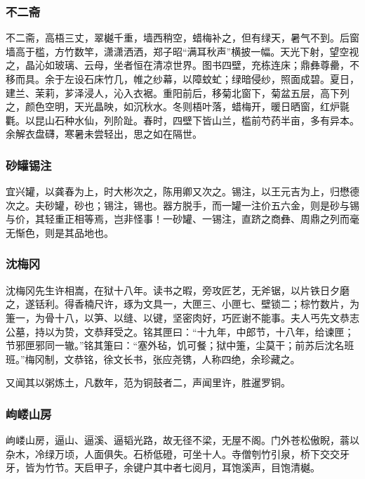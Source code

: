 \documentclass[]{article}
\begin{document}
\hypertarget{header-n158}{%
\subsubsection{不二斋}\label{header-n158}}

不二斋，高梧三丈，翠樾千重，墙西稍空，蜡梅补之，但有绿天，暑气不到。后窗墙高于槛，方竹数竿，潇潇洒洒，郑子昭``满耳秋声''横披一幅。天光下射，望空视之，晶沁如玻璃、云母，坐者恒在清凉世界。图书四壁，充栋连床；鼎彝尊罍，不移而具。余于左设石床竹几，帷之纱幕，以障蚊虻；绿暗侵纱，照面成碧。夏日，建兰、茉莉，芗泽浸人，沁入衣裾。重阳前后，移菊北窗下，菊盆五层，高下列之，颜色空明，天光晶映，如沉秋水。冬则梧叶落，蜡梅开，暖日晒窗，红炉毾氍。以昆山石种水仙，列阶趾。春时，四壁下皆山兰，槛前芍药半亩，多有异本。余解衣盘礴，寒暑未尝轻出，思之如在隔世。

\hypertarget{header-n163}{%
\subsubsection{砂罐锡注}\label{header-n163}}

宜兴罐，以龚春为上，时大彬次之，陈用卿又次之。锡注，以王元吉为上，归懋德次之。夫砂罐，砂也；锡注，锡也。器方脱手，而一罐一注价五六金，则是砂与锡与价，其轻重正相等焉，岂非怪事！一砂罐、一锡注，直跻之商彝、周鼎之列而毫无惭色，则是其品地也。

\hypertarget{header-n168}{%
\subsubsection{沈梅冈}\label{header-n168}}

沈梅冈先生许相嵩，在狱十八年。读书之暇，旁攻匠艺，无斧锯，以片铁日夕磨之，遂铦利。得香楠尺许，琢为文具一，大匣三、小匣七、壁锁二；棕竹数片，为箑一，为骨十八，以笋、以缝、以键，坚密肉好，巧匠谢不能事。夫人丐先文恭志公墓，持以为贽，文恭拜受之。铭其匣曰：``十九年，中郎节，十八年，给谏匣；节邪匣邪同一辙。''铭其箑曰：``塞外毡，饥可餐；狱中箑，尘莫干；前苏后沈名班班。''梅冈制，文恭铭，徐文长书，张应尧镌，人称四绝，余珍藏之。

又闻其以粥炼土，凡数年，范为铜鼓者二，声闻里许，胜暹罗铜。

\hypertarget{header-n174}{%
\subsubsection{岣嵝山房}\label{header-n174}}

岣嵝山房，逼山、逼溪、逼韬光路，故无径不梁，无屋不阁。门外苍松傲睨，蓊以杂木，冷绿万顷，人面俱失。石桥低磴，可坐十人。寺僧刳竹引泉，桥下交交牙牙，皆为竹节。天启甲子，余键户其中者七阅月，耳饱溪声，目饱清樾。
\end{document}
